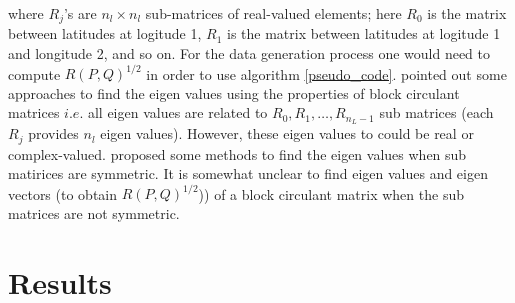 \noi where $R_j$'s are $n_l\times n_l$ sub-matrices of real-valued elements; here $R_0$ is the \cov matrix between latitudes at logitude 1, $R_1$ is the \cov matrix between latitudes at logitude 1 and longitude 2, and so on. For the data generation process one would need to compute $R(P,Q)^{1/2}$ in order to use algorithm \ref{pseudo_code}. \cite{Li2013} pointed out some approaches to find the eigen values using the properties of block circulant matrices $i.e.$ all eigen values are related to $R_0, R_1, \ldots, R_{n_L-1}$ sub matrices (each $R_j$ provides $n_l$ eigen values). However, these eigen values to could be real or complex-valued.  \cite{Tee2005} proposed some methods to find the eigen values when sub matirices are symmetric. It is somewhat unclear to find eigen values and eigen vectors (to obtain $R(P,Q)^{1/2}$)) of a block circulant matrix when the sub matrices are not symmetric. 

\vskip 24pt

	\section{Results}
		
	
	

			
